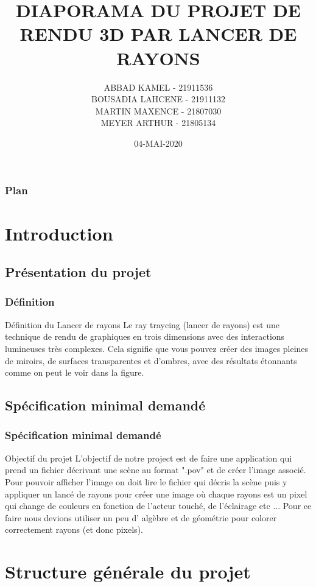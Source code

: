 \documentclass{beamer}
\title{DIAPORAMA DU PROJET DE RENDU 3D PAR LANCER DE RAYONS}
\date{04-MAI-2020}
\author{ ABBAD KAMEL - 21911536 \\
    BOUSADIA LAHCENE - 21911132 \\
    MARTIN MAXENCE - 21807030\\
 	MEYER ARTHUR - 21805134 \\ }
\institute{\textbf{\large Université de Caen Normandie\\
		 PROFESSEUR : G. Bonnet, C. Alec \\}}
\begin{document}
\maketitle
\frametitle{Plan}
\tableofcontents
\section{Introduction}
\subsection{Présentation du projet}
	\begin{frame}
	\frametitle{Définition}
		\begin{block}{Définition du Lancer de rayons}
			Le ray traycing (lancer de rayons) est une technique de rendu de graphiques en trois dimensions avec des interactions lumineuses très complexes. Cela signifie que vous pouvez créer des images pleines de miroirs, de surfaces transparentes et d'ombres, avec des résultats étonnants comme on peut le voir dans la figure.
		\end{block}
	\end{frame}
\subsection{Spécification minimal demandé}
	\begin{frame}
	\frametitle{Spécification minimal demandé}
		\begin{block}{Objectif du projet}
	L'objectif de notre project est de faire une application qui prend un fichier décrivant une scène au format ".pov" et de créer l'image associé. Pour pouvoir afficher l'image on doit lire le fichier qui décris la scène puis y appliquer un lancé de rayons pour créer une image où chaque rayons est un pixel qui change de couleurs en fonction de l'acteur touché, de l'éclairage etc ... Pour ce faire nous devions utiliser un peu d' algèbre et de géométrie pour colorer correctement rayons (et donc pixels).
		\end{block}
	\end{frame}
\section{Structure générale du projet}
\end{document}
